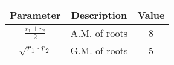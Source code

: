  \begin{tabular}{|c|c|c|}
        \hline
        \textbf{Parameter} & \textbf{Description} & \textbf{Value} \\
        \hline
        $\frac{r_1 + r_2}{2}$& A.M. of roots & 8 \\
        \hline
        $\sqrt{r_1 \cdot r_2}$& G.M. of roots & 5 \\
        \hline
    \end{tabular}

